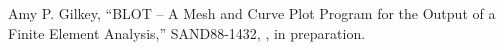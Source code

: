 Amy P. Gilkey,
``BLOT -- A Mesh and Curve Plot Program 
for the Output of a Finite Element Analysis,''
SAND88-1432, \SNLA, in preparation.
